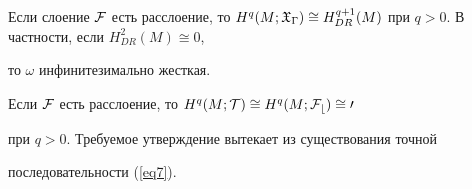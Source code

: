 \begin{cor} \label{cor1}


Если слоение $\cF$ есть расслоение, то $H^q(M;\gX_\Gamma) \cong


H^{q+1}_{DR}(M)$ при $q>0$. В частности, если $H^2_{DR}(M) \cong 0$,


то $\omega$ инфинитезимально жесткая.


\end{cor}





\begin{pf}


Если $\cal F$ есть расслоение, то $H^q(M;{\cal T}) \cong H^q(M;\cal F_b)\cong 0$


при $q>0$. Требуемое утверждение вытекает из существования точной


последовательности (\ref{eq7}).


\end{pf}








